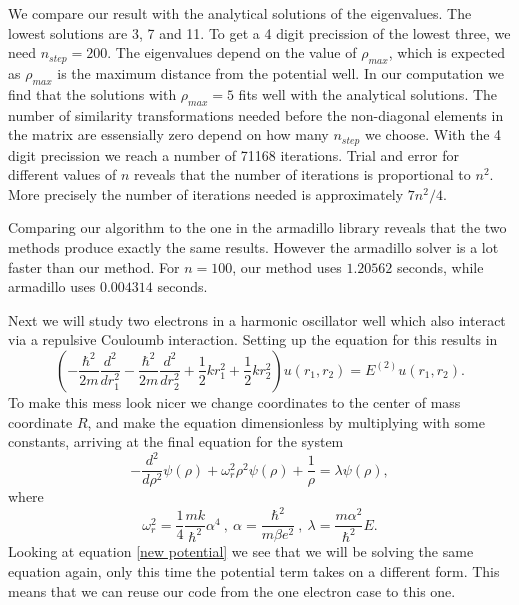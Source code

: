 \documentclass{aa}   %
\begin{document}
We compare our result with the analytical solutions of the eigenvalues. The lowest solutions are 3, 7 and 11. To get a 4 digit precission of the lowest three, we need $n_{step} = 200$. The eigenvalues depend on the value of $\rho_{max}$, which is expected as $\rho_{max}$ is the maximum distance from the potential well. In our computation we find that the solutions with $\rho_{max} = 5$ fits well with the analytical solutions. The number of similarity transformations needed before the non-diagonal elements in the matrix are essensially zero depend on how many $n_{step}$ we choose. With the 4 digit precission we reach a number of 71168 iterations. Trial and error for different values of $n$ reveals that the number of iterations is proportional to $n^2$. More precisely the number of iterations needed is approximately $7n^2/4$.

Comparing our algorithm to the one in the armadillo library reveals that the two methods produce exactly the same results. However the armadillo solver is a lot faster than our method. For $n = 100$, our method uses $1.20562$ seconds, while armadillo uses $0.004314$ seconds.

Next we will study two electrons in a harmonic oscillator well which also interact via a repulsive Couloumb interaction. Setting up the equation for this results in
\begin{equation}\label{Two electrons}
 \left(  -\frac{\hbar^2}{2 m} \frac{d^2}{dr_1^2} -\frac{\hbar^2}{2 m} \frac{d^2}{dr_2^2}+ \frac{1}{2}k r_1^2+ \frac{1}{2}k r_2^2\right)u(r_1,r_2)  = E^{(2)} u(r_1,r_2).
\end{equation}
To make this mess look nicer we change coordinates to the center of mass coordinate $R$, and make the equation dimensionless by multiplying with some constants, arriving at the final equation for the system
\begin{equation}\label{new potential}
   -\frac{d^2}{d\rho^2} \psi(\rho) + \omega_r^2\rho^2\psi(\rho) +\frac{1}{\rho} = \lambda \psi(\rho),
\end{equation}
where 
\begin{equation*}
 \omega_r^2=\frac{1}{4}\frac{mk}{\hbar^2} \alpha^4~,~\alpha = \frac{\hbar^2}{m\beta e^2}~,~\lambda = \frac{m\alpha^2}{\hbar^2}E.
\end{equation*}
Looking at equation \ref{new potential} we see that we will be solving the same equation again, only this time the potential term takes on a different form. This means that we can reuse our code from the one electron case to this one.
\end{document}

